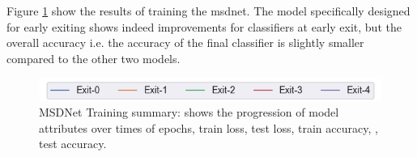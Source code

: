 Figure \ref{fig:msdnet-miniimagenet-100} show the results of training the \gls{msdnet}. The model specifically designed for early exiting shows indeed improvements for classifiers at early exit, but the overall accuracy i.e. the accuracy of the final classifier is slightly smaller compared to the other two models.

\begin{figure}
	\centering
	\captionsetup[subfigure]{justification=centering, farskip=1pt,captionskip=1pt}
	\includegraphics[width=.5\textwidth]{figures/training_plots/msdnet_exit_legend}
	\hfill
	\caption[MSDNet Training summary]{MSDNet Training summary: shows the progression of model attributes over times of epochs, \protect{} train loss, \protect{} test loss, \protect{} train accuracy, \protect{}, test accuracy.}
	\label{fig:msdnet-miniimagenet-100}
\end{figure}

